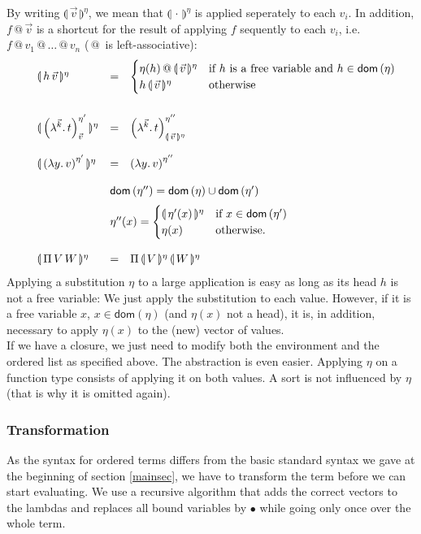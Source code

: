 \documentclass[12pt, a4paper, titlepage]{article}
\makeatletter
\newcommand{\ovar}{\mathord{\bullet}}
\newcommand{\sspace}{\,}
\newcommand{\la}{\lambda}
\newcommand{\emphSec}[1]{#1}
\newcommand{\dom}[1]{\mathsf{dom}\left(#1\right)}
\newcommand{\ClosO}[4]{\left(\la^{#1} . \sspace {#2} \right)^{#3}_{#4}}
\newcommand{\AbsO}[3]{\left( \la {#1}. \sspace {#2} \right)^{#3}}
\newcommand{\FunO}[2]{\Pi \sspace #1 \sspace #2}
\newcommand{\ap}{\,@\,}
\newcommand{\valsub}[2]{\llparenthesis {\,#1\,} \rrparenthesis^{#2}}
\makeatother
\begin{document}
By writing $\valsub{\vec v}{\eta}$, we mean that $\valsub{\cdot}{\eta}$ is applied seperately to each $v_i$. 
In addition, $f \ap {\vec v}$ is a shortcut for the result of applying $f$ sequently to each $v_i$, i.e. $f \ap v_1 \ap \ldots \ap v_n$ ($\ap$ is left-associative): 
\[ 
\begin{array}{llll}
& \valsub{h \sspace \vec v}{\eta} & = & 
\begin{cases} 
\eta(h) \ap \valsub{\vec v}{\eta} &\text{if $h$ is a free variable and $h \in \dom {\eta}$}  \\ h \, \valsub{\vec v}{\eta} &\text{otherwise} 
\end{cases}
\\ \\
\noalign{\medskip}
& \valsub{\ClosO {\vec k} t {\eta'}{\vec v}}{\eta} & = & \ClosO {\vec k} t {\eta''} {\valsub{\vec v}{\eta}}
\\ \\
& \valsub{\AbsO y v {\eta'}}{\eta} & = & \AbsO y v {\eta''}
\\ \\
&& 
\multicolumn{2}{l}{\dom{\eta''} = \dom{\eta} \cup \dom{\eta'}}\\ 
\noalign{\medskip}
&&
\multicolumn 2 l{
\eta''(x) = 
\begin{cases} 
\valsub {\eta'(x)} \eta & \text{if $x \in \dom {\eta'}$} 
\\
\eta(x) &\text{otherwise.}
\end{cases}
} \\
\\
& \valsub{\FunO V W}{\eta} & = & \FunO {\valsub{V}{\eta}} {\valsub{W}{\eta}}
\end{array}
\]
Applying a substitution $\eta$ to a \emphSec{large application} is easy as long as its head $h$ is not a free variable: We just apply the substitution to each value. 
However, if it is a free variable $x$, $x \in \dom{\eta}$ 
(and $\eta(x)$ not a head), it is, in addition, necessary to apply $\eta(x)$ to the (new) vector of values. 
\\
If we have a \emphSec{closure}, we just need to modify both the environment and the ordered list as specified above. The \emphSec{abstraction} is even easier. Applying $\eta$ on a \emphSec{function type} consists of applying it on both values. A \emphSec{sort} is not influenced by $\eta$ (that is why it is omitted again).


\subsubsection{Transformation}
As the syntax for ordered terms differs from the basic standard syntax we gave at the beginning of section \ref{mainsec}, we have to transform the term before we can start evaluating. We use a recursive algorithm that adds the correct vectors to the lambdas and replaces all bound variables by $\ovar$ while going only once over the whole term. 
\end{document}
